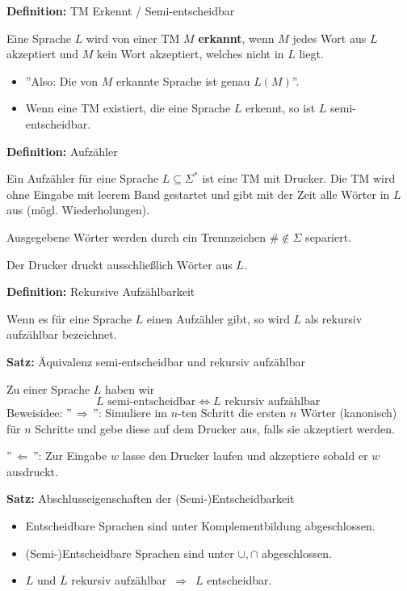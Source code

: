 \documentclass[a4paper,graphics,11pt]{article}
\begin{document}
\textbf{Definition:} TM Erkennt / Semi-entscheidbar

Eine Sprache $L$ wird von einer TM $M$ \textbf{erkannt}, wenn $M$ jedes Wort aus $L$ akzeptiert
und $M$ kein Wort akzeptiert, welches nicht in $L$ liegt.
\begin{itemize}
    \item ''Also: Die von $M$ erkannte Sprache ist genau $L(M)$''.
    \item Wenn eine TM existiert, die eine Sprache $L$ erkennt, so ist $L$ semi-entscheidbar.
\end{itemize}

\strut

\textbf{Definition:} Aufzähler

Ein Aufzähler für eine Sprache $L \subseteq \Sigma^*$ ist eine TM mit Drucker.
Die TM wird ohne Eingabe mit leerem Band gestartet und gibt mit der Zeit alle Wörter in $L$
aus (mögl. Wiederholungen).

Ausgegebene Wörter werden durch ein Trennzeichen $\# \notin \Sigma$ separiert.

Der Drucker druckt ausschließlich Wörter aus $L$.

\strut

\textbf{Definition:} Rekursive Aufzählbarkeit

Wenn es für eine Sprache $L$ einen Aufzähler gibt,
so wird $L$ als rekursiv aufzählbar bezeichnet.

\strut

\textbf{Satz:} Äquivalenz semi-entscheidbar und rekursiv aufzählbar

Zu einer Sprache $L$ haben wir
$$
    L \text{ semi-entscheidbar}
    \iff L \text{ rekursiv aufzählbar }
$$
Beweisidee: ''$\,\Longrightarrow\,$'': Simuliere im $n$-ten Schritt die ersten $n$ Wörter (kanonisch)
für $n$ Schritte und gebe diese auf dem Drucker aus, falls sie akzeptiert werden.

''$\,\Longleftarrow\,$'': Zur Eingabe $w$ lasse den Drucker laufen und akzeptiere sobald er
$w$ ausdruckt.
\newpage

\textbf{Satz:} Abschlusseigenschaften der (Semi-)Entscheidbarkeit
\begin{itemize}
    \item Entscheidbare Sprachen sind unter Komplementbildung abgeschlossen.
    \item (Semi-)Entscheidbare Sprachen sind unter $\cup,\cap$ abgeschlossen.
    \item $L$ und $\overline{L}$ rekursiv aufzählbar $\,\Longrightarrow\,$ $L$ entscheidbar.
\end{itemize}
\end{document}
